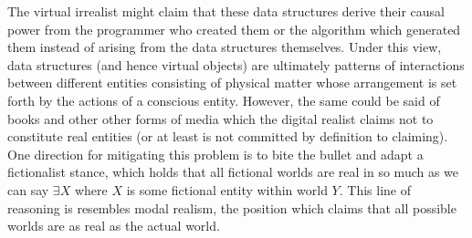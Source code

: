   The virtual irrealist might claim that these data structures derive their causal power from the programmer who created them or the algorithm which generated them instead of arising from the data structures themselves. Under this view, data structures (and hence virtual objects) are ultimately patterns of interactions between different entities consisting of physical matter whose arrangement is set forth by the actions of a conscious entity. However, the same could be said of books and other other forms of media which the digital realist claims not to constitute real entities (or at least is not committed by definition to claiming). One direction for mitigating this problem is to bite the bullet and adapt a fictionalist stance, which holds that all fictional worlds are real in so much as we can say $\exists X$ where $X$ is some fictional entity within world $Y$. This line of reasoning is resembles modal realism, the position which claims that all possible worlds are as real as the actual world.\cite{lewis1986on} 
 \\
 
